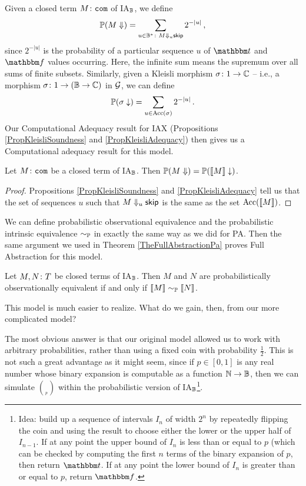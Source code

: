 \documentclass{report}[11pt]
\begin{document}
Given a closed term $M\colon{\mathtt{com}}$ of IA${}_{\mathbb{B}}$, we define
\[
  \mathbb{P}(M\Downarrow) = \sum_{u\in\mathbb{B}^*\colon M\Downarrow_u{\mathsf{skip}}} 2^{-|u|}\,,
  \]
since $2^{-|u|}$ is the probability of a particular sequence $u$ of $\true$ and $\false$ values occurring.
Here, the infinite sum means the supremum over all sums of finite subsets.
Similarly, given a Kleisli morphism $\sigma\colon 1 \to \mathbb{C}$ -- i.e., a morphism $\sigma\colon 1 \to (\mathbb{B} \to \mathbb{C})$ in $\mathcal G$, we can define
\[
  \mathbb{P}(\sigma\downarrow) = \sum_{u\in\operatorname{Acc}(\sigma)} 2^{-|u|}\,.
  \]
Our Computational Adequacy result for IAX (Propositions \ref{PropKleisliSoundness} and \ref{PropKleisliAdequacy}) then gives us a Computational adequacy result for this model.

\begin{proposition}
  Let $M\colon {\mathtt{com}}$ be a closed term of IA${}_{\mathbb{B}}$.  
  Then $\mathbb{P}(M\Downarrow) = \mathbb{P}(\left\llbracket M\right\rrbracket\downarrow)$.
\end{proposition}
\begin{proof}
  Propositions \ref{PropKleisliSoundness} and \ref{PropKleisliAdequacy} tell us that the set of sequences $u$ such that $M\Downarrow_u{\mathsf{skip}}$ is the same as the set $\operatorname{Acc}(\left\llbracket M\right\rrbracket)$.
\end{proof}

We can define probabilistic observational equivalence and the probabilistic intrinsic equivalence $\sim_{\mathbb{P}}$ in exactly the same way as we did for PA.  
Then the same argument we used in Theorem \ref{TheFullAbstractionPa} proves Full Abstraction for this model.

\begin{theorem}
  Let $M,N\colon T$ be closed terms of IA${}_{\mathbb{B}}$.  
  Then $M$ and $N$ are probabilistically observationally equivalent if and only if $\left\llbracket M\right\rrbracket\sim_{\mathbb{P}}\left\llbracket N\right\rrbracket$.
\end{theorem}

This model is much easier to realize.  
What do we gain, then, from our more complicated model?  

The most obvious answer is that our original model allowed us to work with arbitrary probabilities, rather than using a fixed coin with probability $\frac12$.  
This is not such a great advantage as it might seem, since if $p\in[0,1]$ is any real number whose binary expansion is computable as a function $\mathbb{N} \to \mathbb{B}$, then we can simulate $\choose_p$ within the probabilistic version of IA${}_{\mathbb{B}}$\footnote{Idea: build up a sequence of intervals $I_n$ of width $2^n$ by repeatedly flipping the coin and using the result to choose either the lower or the upper half of $I_{n-1}$.  
If at any point the upper bound of $I_n$ is less than or equal to $p$ (which can be checked by computing the first $n$ terms of the binary expansion of $p$, then return $\true$.  
If at any point the lower bound of $I_n$ is greater than or equal to $p$, return $\false$.}.
\end{document}
